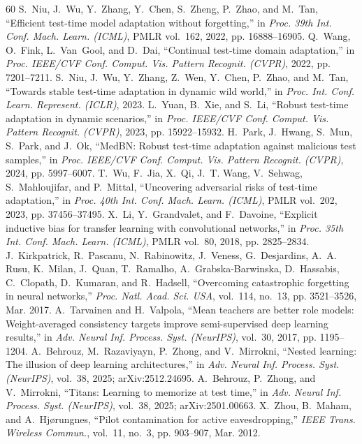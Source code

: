 \documentclass[journal]{IEEEtran}
\theoremstyle{remark}
\begin{document}
\begin{thebibliography}{60}
 S.~Niu, J.~Wu, Y.~Zhang, Y.~Chen, S.~Zheng, P.~Zhao, and M.~Tan, ``Efficient test-time model adaptation without forgetting,'' in \emph{Proc. 39th Int. Conf. Mach. Learn. (ICML)}, PMLR vol.~162, 2022, pp. 16888--16905.
 Q.~Wang, O.~Fink, L.~Van~Gool, and D.~Dai, ``Continual test-time domain adaptation,'' in \emph{Proc. IEEE/CVF Conf. Comput. Vis. Pattern Recognit. (CVPR)}, 2022, pp. 7201--7211.
 S.~Niu, J.~Wu, Y.~Zhang, Z.~Wen, Y.~Chen, P.~Zhao, and M.~Tan, ``Towards stable test-time adaptation in dynamic wild world,'' in \emph{Proc. Int. Conf. Learn. Represent. (ICLR)}, 2023.
 L.~Yuan, B.~Xie, and S.~Li, ``Robust test-time adaptation in dynamic scenarios,'' in \emph{Proc. IEEE/CVF Conf. Comput. Vis. Pattern Recognit. (CVPR)}, 2023, pp. 15922--15932.
 H.~Park, J.~Hwang, S.~Mun, S.~Park, and J.~Ok, ``MedBN: Robust test-time adaptation against malicious test samples,'' in \emph{Proc. IEEE/CVF Conf. Comput. Vis. Pattern Recognit. (CVPR)}, 2024, pp. 5997--6007.
 T.~Wu, F.~Jia, X.~Qi, J.~T. Wang, V.~Sehwag, S.~Mahloujifar, and P.~Mittal, ``Uncovering adversarial risks of test-time adaptation,'' in \emph{Proc. 40th Int. Conf. Mach. Learn. (ICML)}, PMLR vol.~202, 2023, pp. 37456--37495.
 X.~Li, Y.~Grandvalet, and F.~Davoine, ``Explicit inductive bias for transfer learning with convolutional networks,'' in \emph{Proc. 35th Int. Conf. Mach. Learn. (ICML)}, PMLR vol.~80, 2018, pp. 2825--2834.
 J.~Kirkpatrick, R.~Pascanu, N.~Rabinowitz, J.~Veness, G.~Desjardins, A.~A. Rusu, K.~Milan, J.~Quan, T.~Ramalho, A.~Grabska-Barwinska, D.~Hassabis, C.~Clopath, D.~Kumaran, and R.~Hadsell, ``Overcoming catastrophic forgetting in neural networks,'' \emph{Proc. Natl. Acad. Sci. USA}, vol.~114, no.~13, pp. 3521--3526, Mar. 2017.
 A.~Tarvainen and H.~Valpola, ``Mean teachers are better role models: Weight-averaged consistency targets improve semi-supervised deep learning results,'' in \emph{Adv. Neural Inf. Process. Syst. (NeurIPS)}, vol.~30, 2017, pp. 1195--1204.
 A.~Behrouz, M.~Razaviyayn, P.~Zhong, and V.~Mirrokni, ``Nested learning: The illusion of deep learning architectures,'' in \emph{Adv. Neural Inf. Process. Syst. (NeurIPS)}, vol.~38, 2025; arXiv:2512.24695.
 A.~Behrouz, P.~Zhong, and V.~Mirrokni, ``Titans: Learning to memorize at test time,'' in \emph{Adv. Neural Inf. Process. Syst. (NeurIPS)}, vol.~38, 2025; arXiv:2501.00663.
 X.~Zhou, B.~Maham, and A.~Hj{\o}rungnes, ``Pilot contamination for active eavesdropping,'' \emph{IEEE Trans. Wireless Commun.}, vol.~11, no.~3, pp. 903--907, Mar. 2012.

\end{thebibliography}
\end{document}
